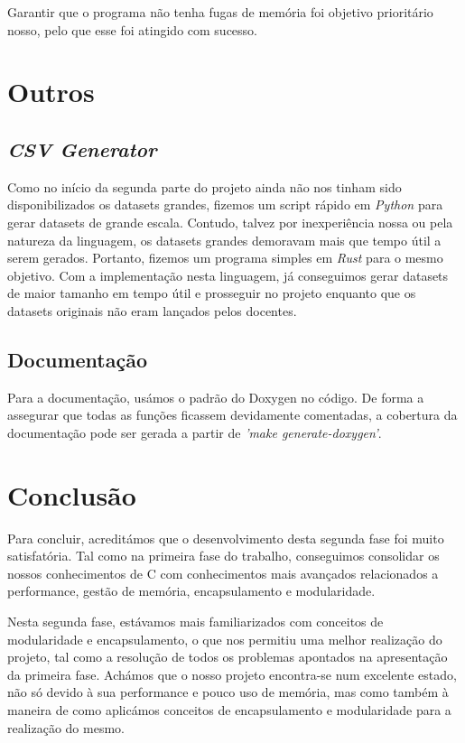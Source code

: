 \documentclass{article}
\begin{document}
            Garantir que o programa não tenha fugas de memória foi objetivo prioritário nosso, 
            pelo que esse foi atingido com sucesso.
        \newpage
        \section{Outros}
            \subsection{\emph{CSV Generator}}            
                Como no início da segunda parte do projeto ainda não nos tinham sido disponibilizados os datasets grandes,
                fizemos um script rápido em \textit{Python} para gerar datasets de grande escala. Contudo, talvez
                por inexperiência nossa ou pela natureza da linguagem, os datasets grandes demoravam mais que tempo útil 
                a serem gerados. Portanto, fizemos um programa simples em \textit{Rust} para o mesmo objetivo.
                Com a implementação nesta linguagem, já conseguimos gerar datasets de maior tamanho 
                em tempo útil e prosseguir no projeto enquanto que os datasets originais não eram lançados pelos docentes.
            \subsection{Documentação}
                Para a documentação, usámos o padrão do Doxygen no código.
                De forma a assegurar que todas as funções ficassem devidamente comentadas,
                a cobertura da documentação pode ser gerada a partir de \textit{'make generate-doxygen'}.

        \section{Conclusão}
        Para concluir, acreditámos que o desenvolvimento desta segunda fase foi
        muito satisfatória. Tal como na primeira fase do trabalho, conseguimos consolidar 
        os nossos conhecimentos de C com conhecimentos mais avançados relacionados a performance,
        gestão de memória, encapsulamento e modularidade. 

        Nesta segunda fase, estávamos mais familiarizados com conceitos de
        modularidade e encapsulamento, o que nos permitiu uma melhor realização
        do projeto, tal como a resolução de todos os problemas apontados na apresentação da primeira
        fase. Achámos que o nosso projeto encontra-se num excelente estado, não só devido
        à sua performance e pouco uso de memória, mas como também à maneira de como 
        aplicámos conceitos de encapsulamento e modularidade para a realização do mesmo.
\end{document}
